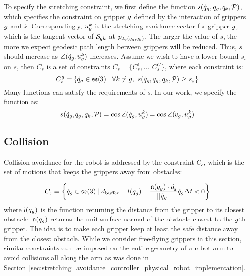 To specify the stretching constraint, we first define the function $s(\dot{q}_g, q_g, q_k, \mathcal{P})$, which specifies the constraint on gripper $g$ defined by the interaction of grippers $g$ and $k$. Correspondingly, $u_g^k$ is the stretching avoidance vector for gripper $g$, which is the tangent vector of $\mathcal{S}_{g k}$ at $p_{\mathcal{I}_g(q_g, q_k)}$. The larger the value of $s$, the more we expect geodesic path length between grippers will be reduced. Thus, $s$ should increase as $\angle (\dot{q}_g, u_g^k)$ increases. Assume we wish to have a lower bound $s_s$ on $s$, then $C_s$ is a set of constraints $C_s = \{C_s^1, \dots, C_s^G\}$, where each constraint is:
\begin{equation}
    C_s^g =\{ \dot{q}_g\in \mathfrak{se}(3) \mid \forall k\neq g, \ s(\dot{q}_g, q_g, q_k, \mathcal{P}) \geq s_s  \}
    \label{Eq:Stretching_avoidance_Method}
\end{equation}
Many functions can satisfy the requirements of $s$. In our work, we specify the function as:
\begin{equation}
    s(\dot{q}_g, q_g, q_k, \mathcal{P}) = \cos \angle (\dot{q}_g, u_g^k ) = \cos \angle (v_g, u_g^k )
    \label{Eq:Stretching_avoidance_Method_This_Paper}
\end{equation}

\subsection{Collision} Collision avoidance for the robot is addressed by the constraint $C_c$, which is the set of motions that keeps the grippers away from obstacles:


\begin{equation}
    C_c = \left\{\dot{q}_g\in \mathfrak{se}(3) \mid  d_\textrm{buffer} - l(q_g) - \frac{\mathfrak{n}(q_g) \cdot \dot{q}_g}{||\dot{q}_g||} \dot{q}_g \Delta t < 0\right\}
    \label{Eq:Collision_constraint_Method}
\end{equation}
where $l(q_g)$ is the function returning the distance from the gripper to its closest obstacle. $\mathfrak{n}(q_g)$ returns the unit surface normal of the obstacle closest to the $g$th gripper. The idea is to make each gripper keep at least the safe distance away from the closest obstacle. While we consider free-flying grippers in this section, similar constraints can be imposed on the entire geometry of a robot arm to avoid collisions all along the arm as was done in Section~\ref{sec:stretching_avoidance_controller_physical_robot_implementation}.


